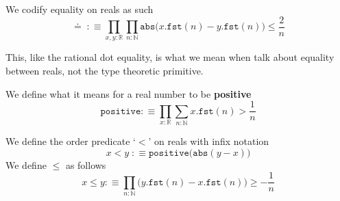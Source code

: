 \documentclass[12pt]{report}
\newcommand\todo[1]{\textcolor{red}{#1}}
\newtheorem{prop}[thm]{Proposition}
\theoremstyle{definition}
\begin{document}
We codify equality on reals as such
$$\doteq\;:\equiv \prod_{x,y : \mathbb{R}} \prod_{n : \mathbb{N}} \mathtt{abs}\big( x.\mathtt{fst}(n) - y.\mathtt{fst}(n)\big) \leq \frac{2}{n}$$

This, like the rational dot equality, is what we mean when talk about equality between reals, not the type theoretic primitive. 

We define what it means for a real number to be \textbf{positive}
$$\mathtt{positive} :\equiv \prod_{x: \mathbb{R}} \sum_{n : \mathbb{N}} x.\mathtt{fst}(n) > \frac{1}{n}$$

We define the order predicate `$<$' on reals with infix notation
$$x<y\; :\equiv \mathtt{positive}\big( \mathtt{abs}(y-x) \big)$$
We define $\leq$ as follows
$$x \leq y :\equiv \prod_{n : \mathbb{N}} \big( y.\mathtt{fst}(n) - x.\mathtt{fst}(n) \big) \geq -\frac{1}{n}$$

\printbibliography
\end{document}

